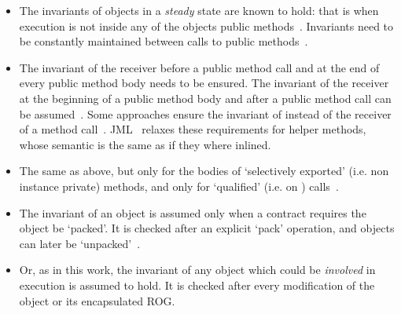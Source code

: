 \begin{itemize}
\item The invariants of objects in a \textit{steady} state are known to hold: that is when execution is not inside any of the objects public methods~\cite{Gopinathan:2008:RMO:1483018.1483028}. Invariants need to be constantly maintained between calls to public methods~\cite{WikiInvariant}.
\item 
The invariant of the receiver before a public method call and at the end of every public method body needs to be ensured. The invariant of the receiver at the beginning of a public method body and after a public method call can be assumed~\cite{Burdy2005,drossopoulou2008unified}.  
Some approaches ensure the invariant of \Q@this@ instead of the receiver of a method call~\cite{?}.
JML~\cite{JML} relaxes these requirements for helper methods, whose semantic is the same as if they where inlined.


\item The same as above, but only for the bodies of `selectively exported' (i.e. non instance private) methods, and only for `qualified' (i.e. on \Q@this@) calls~\cite{meyer2016class}.
\item The invariant of an object is assumed only when a contract requires the object be `packed'. It is checked after an explicit `pack' operation, and objects can later be `unpacked'~\cite{?}.
\item Or, as in this work, the invariant of any object which could be \emph{involved} in execution is assumed to hold. It is checked after every modification of the object or its encapsulated ROG.
\end{itemize}


